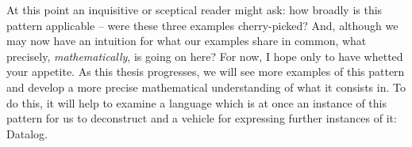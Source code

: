 
At this point an inquisitive or sceptical reader might ask: how broadly is this
pattern applicable -- were these three examples cherry-picked?
%
And, although we may now have an intuition for what our examples share in
common, what precisely, \emph{mathematically}, is going on here?
%
For now, I hope only to have whetted your appetite.
%
As this thesis progresses, we will see more examples of this pattern and develop a more precise mathematical understanding of what it consists in.
%
To do this, it will help to examine a language which is at once an instance of
this pattern for us to deconstruct and a vehicle for expressing further
instances of it: Datalog.







